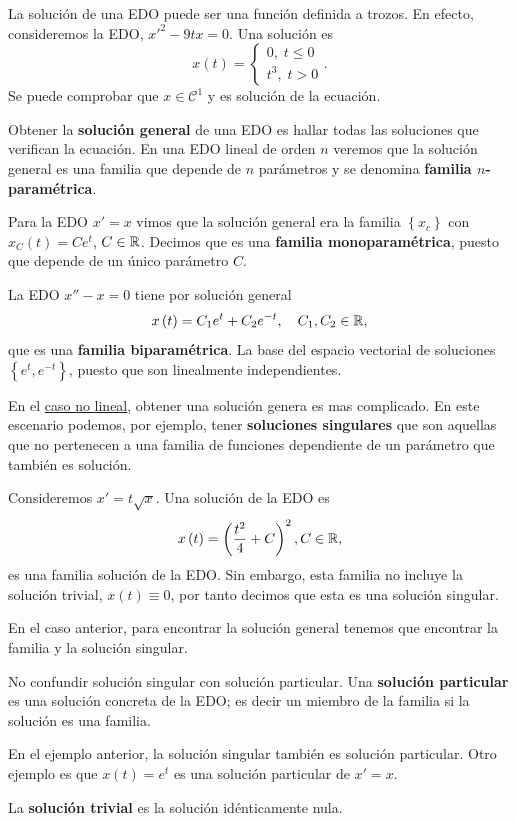 \begin{eg}
La solución de una EDO puede ser una función definida a trozos. En efecto, consideremos la EDO, $\displaystyle x'^{2} - 9tx = 0 $. Una solución es
\[x\left(t\right) = 
\begin{cases}
0, \; t \leq 0 \\
t ^{3}, \; t > 0
\end{cases}
.\]
Se puede comprobar que $\displaystyle x\in\mathcal{C}^{1} $ y es solución de la ecuación. 
\end{eg}
Obtener la \textbf{solución general} de una EDO es hallar todas las soluciones que verifican la ecuación. En una EDO lineal de orden $\displaystyle n $ veremos que la solución general es una familia que depende de $\displaystyle n $ parámetros y se denomina \textbf{familia $\displaystyle n $-paramétrica}. 
\begin{eg}
	Para la EDO $\displaystyle x' = x $ vimos que la solución general era la familia $\displaystyle \left\{ x_{c}\right\}  $ con $\displaystyle x_{C}\left(t\right) = Ce^{t} $, $\displaystyle C \in \mathbb{R} $. Decimos que es una \textbf{familia monoparamétrica}, puesto que depende de un único parámetro $\displaystyle C $. 
\end{eg}
\begin{eg}
La EDO $\displaystyle x'' - x = 0 $ tiene por solución general 
\[x\left(t\right) = C_{1}e^{t} + C_{2}e^{-t}, \quad C_{1}, C_{2} \in \mathbb{R} ,\]
que es una \textbf{familia biparamétrica}. La base del espacio vectorial de soluciones $\displaystyle \left\{ e^{t}, e^{-t}\right\}  $, puesto que son linealmente independientes. 
\end{eg}
En el \underline{caso no lineal}, obtener una solución genera es mas complicado. En este escenario podemos, por ejemplo, tener \textbf{soluciones singulares} que son aquellas que no pertenecen a una familia de funciones dependiente de un parámetro que también es solución.
\begin{eg}
Consideremos $\displaystyle x' = t\sqrt{x} $. Una solución de la EDO es
\[x\left(t\right) = \left(\frac{t ^{2}}{4} + C\right)^{2}, C \in \mathbb{R} ,\]
es una familia solución de la EDO. Sin embargo, esta familia no incluye la solución trivial, $\displaystyle x\left(t\right)\equiv 0 $, por tanto decimos que esta es una solución singular.
\end{eg}
En el caso anterior, para encontrar la solución general tenemos que encontrar la familia y la solución singular. 
\begin{observation}
No confundir solución singular con solución particular. Una \textbf{solución particular} es una solución concreta de la EDO; es decir un miembro de la familia si la solución es una familia. 
\end{observation}
\begin{eg}
En el ejemplo anterior, la solución singular también es solución particular. Otro ejemplo es que $\displaystyle x\left(t\right)= e^{t} $ es una solución particular de $\displaystyle x' = x $.
\end{eg}
\begin{notation}
La \textbf{solución trivial} es la solución idénticamente nula. 
\end{notation}
